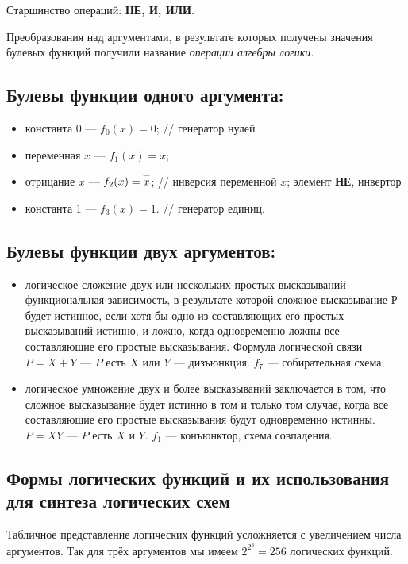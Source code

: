 \documentclass[10pt,a4paper,titlepage]{article}
\begin{document}
Старшинство операций: \textbf{НЕ, И, ИЛИ}.

Преобразования над аргументами, в результате которых получены значения булевых функций получили название \textit{операции алгебры логики}.

\subsection{Булевы функции одного аргумента:}

\begin{itemize}
\item константа 0 --- $f_0(x) = 0$; // генератор нулей
\item переменная $x$ --- $f_1(x) = x$;
\item отрицание $x$ --- $f_2(x) = \overline{\mathstrut x}$; // инверсия переменной $x$; элемент \textbf{НЕ}, инвертор
\item константа 1 --- $f_3(x) = 1$. // генератор единиц.
\end{itemize}

\subsection{Булевы функции двух аргументов:}

\begin{itemize}
\item логическое сложение двух или нескольких простых высказываний --- функциональная зависимость, в результате которой сложное высказывание $Р$ будет истинное, если хотя бы одно из составляющих его простых высказываний истинно, и ложно, когда одновременно ложны все составляющие его простые высказывания.
Формула логической связи $P=X+Y$ --- $P$ есть $X$ или $Y$ --- дизъюнкция.
$f_7$ --- собирательная схема;
\item логическое умножение двух и более высказываний заключается в том, что сложное высказывание будет истинно в том и только том случае, когда все составляющие его простые высказывания будут одновременно истинны. $P=XY$ --- $P$ есть $X$ и $Y$.
$f_1$ --- конъюнктор, схема совпадения.
\end{itemize}

\subsection{Формы логических функций и их использования для синтеза логических схем}

Табличное представление логических функций усложняется с увеличением числа аргументов.
Так для трёх аргументов мы имеем $2^{2^3} = 256$ логических функций.
\end{document}
